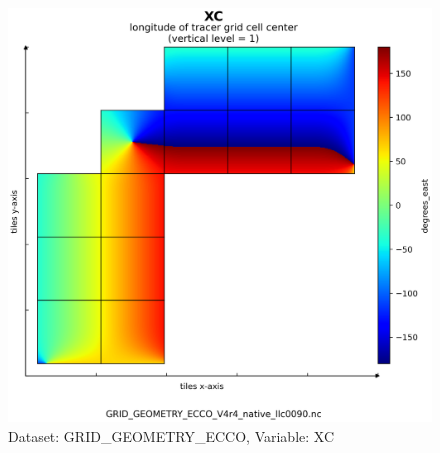 \begin{figure}[H]
\centering
\includegraphics[scale=0.55]{../images/plots/v4r4/native_plots_coords/Geometry_Parameters_for_the_Lat-Lon-Cap_90_(llc90)_Native_Model_Grid_(Version_4_Release_4)/XC.png}
\caption{Dataset: GRID\_GEOMETRY\_ECCO, Variable: XC}
\label{tab:table-GRID_GEOMETRY_ECCO_XC-Plot}
\end{figure}
\newpage
\pagebreak
